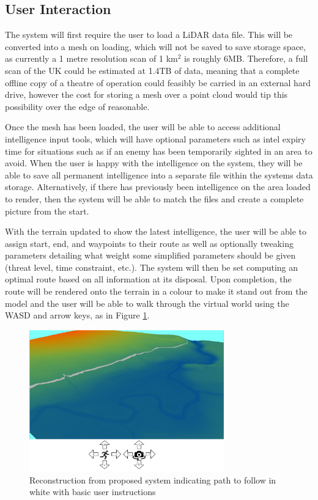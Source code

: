 \documentclass[12pt,a4paper]{article}
\begin{document}
  \subsection{User Interaction}
  \noindent The system will first require the user to load a LiDAR data file. This will be converted into a mesh on loading, which will not be saved to save storage space, as currently a 1 metre resolution scan of 1 km$^2$ is roughly 6MB. Therefore, a full scan of the UK could be estimated at 1.4TB of data, meaning that a complete offline copy of a theatre of operation could feasibly be carried in an external hard drive, however the cost for storing a mesh over a point cloud would tip this possibility over the edge of reasonable.
  \par Once the mesh has been loaded, the user will be able to access additional intelligence input tools, which will have optional parameters such as intel expiry time for situations such as if an enemy has been temporarily sighted in an area to avoid. When the user is happy with the intelligence on the system, they will be able to save all permanent intelligence into a separate file within the system\textquotesingle s data storage. Alternatively, if there has previously been intelligence on the area loaded to render, then the system will be able to match the files and create a complete picture from the start.
  \par With the terrain updated to show the latest intelligence, the user will be able to assign start, end, and waypoints to their route as well as optionally tweaking parameters detailing what weight some simplified parameters should be given (threat level, time constraint, etc.). The system will then be set computing an optimal route based on all information at its disposal. Upon completion, the route will be rendered onto the terrain in a colour to make it stand out from the model and the user will be able to walk through the virtual world using the WASD and arrow keys, as in Figure \ref{terrain_fig}.

  \begin{figure}[htb]
    \centering
    \includegraphics[width=0.75\textwidth]{terrain_reconstruction}
    \caption{Reconstruction from proposed system indicating path to follow in white with basic user instructions}
    \label{terrain_fig}
  \end{figure}
\end{document}

